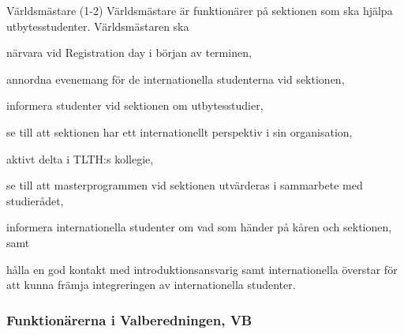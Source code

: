 \documentclass[10pt]{article}
\begin{document}
\begin{emptylist}
    \item Världsmästare (1-2)
    	Världsmästare är funktionärer på sektionen som ska hjälpa utbytesstudenter. Världsmästaren ska
    	 \begin{dashlist}
    		\item närvara vid Registration day i början av terminen,
    		\item annordna evenemang för de internationella studenterna vid sektionen,
    		\item informera studenter vid sektionen om utbytesstudier,
    		\item se till att sektionen har ett internationellt perspektiv i sin organisation,
    		\item aktivt delta i TLTH:s kollegie,
    		\item se till att masterprogrammen vid sektionen utvärderas i sammarbete med studierådet,
    		\item informera internationella studenter om vad som händer på kåren och sektionen, samt
    		\item hålla en god kontakt med introduktionsansvarig samt internationella överstar för att kunna främja integreringen av internationella studenter.
    	\end{dashlist}
\end{emptylist}
\subsubsection{Funktionärerna i Valberedningen, VB}
\end{document}
